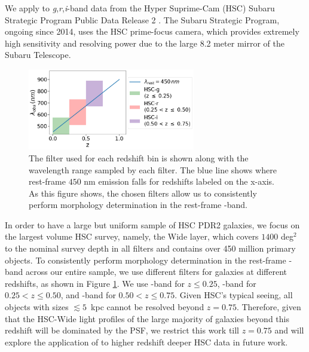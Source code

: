We apply \gampen{} to \textit{g},\textit{r},\textit{i}-band data from the Hyper Suprime-Cam (HSC) Subaru Strategic Program Public Data Release 2 \citep[PDR2;][]{hsc_pdr2}. The Subaru Strategic Program, ongoing since 2014, uses the HSC prime-focus camera, which provides extremely high sensitivity and resolving power due to the large 8.2 meter mirror of the Subaru Telescope. 
\begin{figure}[htb]
    \centering
    \includegraphics[width = 0.65\textwidth]{data_lambda.png}
    \caption{
    The filter used for each redshift bin is shown along with the wavelength range sampled by each filter. The blue line shows where rest-frame $450$ nm emission falls for redshifts labeled on the x-axis. As this figure shows, the chosen filters allow us to consistently perform morphology determination in the rest-frame \gb{}-band.}
    \label{fig_c3:hsc_response}
\end{figure}

In order to have a large but uniform sample of HSC PDR2 galaxies, we focus on the largest volume HSC survey, namely, the Wide layer, which covers $1400$ deg$^2$ to the nominal survey depth in all filters and contains over 450 million primary objects. To consistently perform morphology determination in the rest-frame \gb-band across our entire sample, we use different filters for galaxies at different redshifts, as shown in Figure \ref{fig_c3:hsc_response}. We use \gb-band for $z\leq0.25$, \rb-band for $0.25<z\leq0.50$, and \ib-band for $0.50<z\leq0.75$. Given HSC's typical seeing, all objects with sizes $\lesssim5$\, kpc cannot be resolved beyond $z=0.75$. Therefore, given that the HSC-Wide light profiles of the large majority of galaxies beyond this redshift will be dominated by the PSF, we restrict this work till $z=0.75$ and will explore the application of \gampen{} to higher redshift deeper HSC data in future work. 

